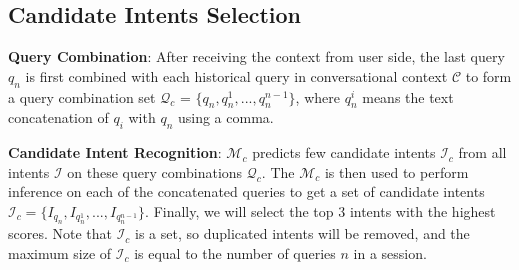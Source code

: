 \begin{table}[t]
\centering
{}
\caption{Noticeable improvement from adding a state-of-the-art HTC approach.} 
\vspace{-0.2cm}
\label{table:htc_improvement}
\end{table}


\subsection{Candidate Intents Selection}
\textbf{Query Combination}: After receiving the context from user side, the last query $q_n$ is first combined with each historical query in conversational context $\mathcal{C}$ to form a query combination set $\mathcal{Q}_c$ = $\{q_n, q^1_n, ..., q^{n-1}_n\}$, where $q^i_n$ means the text concatenation of $q_i$ with $q_n$ using a comma. 

\noindent\textbf{Candidate Intent Recognition}: $\mathcal{M}_c$ predicts few candidate intents $\mathcal{I}_{c}$ from all intents $\mathcal{I}$ on these query combinations $\mathcal{Q}_c$. The $\mathcal{M}_c$ is then used to perform inference on each of the concatenated queries to get a set of candidate intents $\mathcal{I}_{c} = \{I_{q_n}, I_{q^1_n}, ..., I_{q^{n-1}_n}\}$. Finally, we will select the top 3 intents with the highest scores. Note that $\mathcal{I}_{c}$ is a set, so duplicated intents will be removed, and the maximum size of $\mathcal{I}_{c}$ is equal to the number of queries $n$ in a session. 


